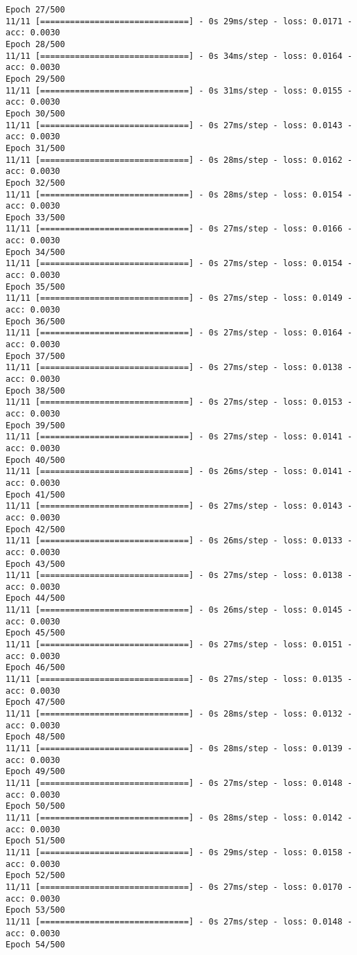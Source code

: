 \documentclass[11pt]{article}
\begin{document}
\begin{Verbatim}[commandchars=\\\{\}]
Epoch 27/500
11/11 [==============================] - 0s 29ms/step - loss: 0.0171 - acc: 0.0030
Epoch 28/500
11/11 [==============================] - 0s 34ms/step - loss: 0.0164 - acc: 0.0030
Epoch 29/500
11/11 [==============================] - 0s 31ms/step - loss: 0.0155 - acc: 0.0030
Epoch 30/500
11/11 [==============================] - 0s 27ms/step - loss: 0.0143 - acc: 0.0030
Epoch 31/500
11/11 [==============================] - 0s 28ms/step - loss: 0.0162 - acc: 0.0030
Epoch 32/500
11/11 [==============================] - 0s 28ms/step - loss: 0.0154 - acc: 0.0030
Epoch 33/500
11/11 [==============================] - 0s 27ms/step - loss: 0.0166 - acc: 0.0030
Epoch 34/500
11/11 [==============================] - 0s 27ms/step - loss: 0.0154 - acc: 0.0030
Epoch 35/500
11/11 [==============================] - 0s 27ms/step - loss: 0.0149 - acc: 0.0030
Epoch 36/500
11/11 [==============================] - 0s 27ms/step - loss: 0.0164 - acc: 0.0030
Epoch 37/500
11/11 [==============================] - 0s 27ms/step - loss: 0.0138 - acc: 0.0030
Epoch 38/500
11/11 [==============================] - 0s 27ms/step - loss: 0.0153 - acc: 0.0030
Epoch 39/500
11/11 [==============================] - 0s 27ms/step - loss: 0.0141 - acc: 0.0030
Epoch 40/500
11/11 [==============================] - 0s 26ms/step - loss: 0.0141 - acc: 0.0030
Epoch 41/500
11/11 [==============================] - 0s 27ms/step - loss: 0.0143 - acc: 0.0030
Epoch 42/500
11/11 [==============================] - 0s 26ms/step - loss: 0.0133 - acc: 0.0030
Epoch 43/500
11/11 [==============================] - 0s 27ms/step - loss: 0.0138 - acc: 0.0030
Epoch 44/500
11/11 [==============================] - 0s 26ms/step - loss: 0.0145 - acc: 0.0030
Epoch 45/500
11/11 [==============================] - 0s 27ms/step - loss: 0.0151 - acc: 0.0030
Epoch 46/500
11/11 [==============================] - 0s 27ms/step - loss: 0.0135 - acc: 0.0030
Epoch 47/500
11/11 [==============================] - 0s 28ms/step - loss: 0.0132 - acc: 0.0030
Epoch 48/500
11/11 [==============================] - 0s 28ms/step - loss: 0.0139 - acc: 0.0030
Epoch 49/500
11/11 [==============================] - 0s 27ms/step - loss: 0.0148 - acc: 0.0030
Epoch 50/500
11/11 [==============================] - 0s 28ms/step - loss: 0.0142 - acc: 0.0030
Epoch 51/500
11/11 [==============================] - 0s 29ms/step - loss: 0.0158 - acc: 0.0030
Epoch 52/500
11/11 [==============================] - 0s 27ms/step - loss: 0.0170 - acc: 0.0030
Epoch 53/500
11/11 [==============================] - 0s 27ms/step - loss: 0.0148 - acc: 0.0030
Epoch 54/500

\end{Verbatim}
\end{document}
